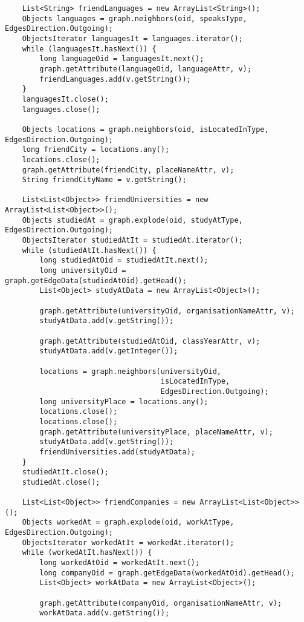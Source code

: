 {\begin{verbatim}
    List<String> friendLanguages = new ArrayList<String>();
    Objects languages = graph.neighbors(oid, speaksType, EdgesDirection.Outgoing);
    ObjectsIterator languagesIt = languages.iterator();
    while (languagesIt.hasNext()) {
        long languageOid = languagesIt.next();
        graph.getAttribute(languageOid, languageAttr, v);
        friendLanguages.add(v.getString());
    }
    languagesIt.close();
    languages.close();

    Objects locations = graph.neighbors(oid, isLocatedInType, EdgesDirection.Outgoing);
    long friendCity = locations.any();
    locations.close();
    graph.getAttribute(friendCity, placeNameAttr, v);
    String friendCityName = v.getString();

    List<List<Object>> friendUniversities = new ArrayList<List<Object>>();
    Objects studiedAt = graph.explode(oid, studyAtType, EdgesDirection.Outgoing);
    ObjectsIterator studiedAtIt = studiedAt.iterator();
    while (studiedAtIt.hasNext()) {
        long studiedAtOid = studiedAtIt.next();
        long universityOid = graph.getEdgeData(studiedAtOid).getHead();
        List<Object> studyAtData = new ArrayList<Object>();

        graph.getAttribute(universityOid, organisationNameAttr, v);
        studyAtData.add(v.getString());

        graph.getAttribute(studiedAtOid, classYearAttr, v);
        studyAtData.add(v.getInteger());

        locations = graph.neighbors(universityOid, 
                                    isLocatedInType, 
                                    EdgesDirection.Outgoing);
        long universityPlace = locations.any();
        locations.close();
        locations.close();
        graph.getAttribute(universityPlace, placeNameAttr, v);
        studyAtData.add(v.getString());
        friendUniversities.add(studyAtData);
    }
    studiedAtIt.close();
    studiedAt.close();

    List<List<Object>> friendCompanies = new ArrayList<List<Object>>();
    Objects workedAt = graph.explode(oid, workAtType, EdgesDirection.Outgoing);
    ObjectsIterator workedAtIt = workedAt.iterator();
    while (workedAtIt.hasNext()) {
        long workedAtOid = workedAtIt.next();
        long companyOid = graph.getEdgeData(workedAtOid).getHead();
        List<Object> workAtData = new ArrayList<Object>();

        graph.getAttribute(companyOid, organisationNameAttr, v);
        workAtData.add(v.getString());


\end{verbatim}}
